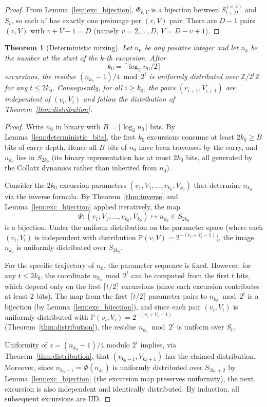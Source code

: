 \documentclass[12pt,a4paper]{article}
\newtheorem{theorem}{Theorem}[section]
\newcommand{\Prob}{\mathbb{P}}
\newcommand{\Z}{\mathbb{Z}}
\begin{document}
\begin{proof}
From Lemma~\ref{lem:exc_bijection}, $\Phi_{v,V}$ is a bijection between $S_{t+D}^{(v,V)}$ and $S_t$, so each $n'$ has exactly one preimage per $(v,V)$ pair. There are $D-1$ pairs $(v,V)$ with $v+V-1 = D$ (namely $v = 2,\ldots,D$, $V = D-v+1$).
\end{proof}

\begin{theorem}[Deterministic mixing]\label{thm:mixing}
Let $n_0$ be any positive integer and let $n_k$ be the number at the start of the $k$-th excursion. After
\[
k_0 = \lceil \log_2 n_0 / 2 \rceil
\]
excursions, the residue $(n_{k_0} - 1)/4 \bmod 2^t$ is uniformly distributed over $\Z/2^t\Z$ for any $t \le 2k_0$. Consequently, for all $i \ge k_0$, the pairs $(v_{i+1}, V_{i+1})$ are independent of $(v_i, V_i)$ and follow the distribution of Theorem~\ref{thm:distribution}.
\end{theorem}

\begin{proof}
Write $n_0$ in binary with $B = \lceil \log_2 n_0 \rceil$ bits. By Lemma~\ref{lem:deterministic_bits}, the first $k_0$ excursions consume at least $2k_0 \ge B$ bits of carry depth. Hence all $B$ bits of $n_0$ have been traversed by the carry, and $n_{k_0}$ lies in $S_{2k_0}$ (its binary representation has at most $2k_0$ bits, all generated by the Collatz dynamics rather than inherited from $n_0$).

Consider the $2k_0$ excursion parameters $(v_1,V_1,\ldots,v_{k_0},V_{k_0})$ that determine $n_{k_0}$ via the inverse formula. By Theorem~\ref{thm:inverse} and Lemma~\ref{lem:exc_bijection} applied iteratively, the map
\[
\Psi: (v_1,V_1,\ldots,v_{k_0},V_{k_0}) \longmapsto n_{k_0} \in S_{2k_0}
\]
is a bijection. Under the uniform distribution on the parameter space (where each $(v_i,V_i)$ is independent with distribution $\Prob(v,V) = 2^{-(v_i+V_i-1)}$), the image $n_{k_0}$ is uniformly distributed over $S_{2k_0}$.

For the specific trajectory of $n_0$, the parameter sequence is fixed. However, for any $t \le 2k_0$, the coordinate $n_{k_0} \bmod 2^t$ can be computed from the first $t$ bits, which depend only on the first $\lceil t/2 \rceil$ excursions (since each excursion contributes at least $2$ bits). The map from the first $\lceil t/2 \rceil$ parameter pairs to $n_{k_0} \bmod 2^t$ is a bijection (by Lemma~\ref{lem:exc_bijection}), and since each pair $(v_i,V_i)$ is uniformly distributed with $\Prob(v_i,V_i) = 2^{-(v_i+V_i-1)}$ (Theorem~\ref{thm:distribution}), the residue $n_{k_0} \bmod 2^t$ is uniform over $S_t$.

Uniformity of $z = (n_{k_0}-1)/4$ modulo $2^t$ implies, via Theorem~\ref{thm:distribution}, that $(v_{k_0+1}, V_{k_0+1})$ has the claimed distribution. Moreover, since $n_{k_0+1} = \Phi(n_{k_0})$ is uniformly distributed over $S_{2k_0+2}$ by Lemma~\ref{lem:exc_bijection} (the excursion map preserves uniformity), the next excursion is also independent and identically distributed. By induction, all subsequent excursions are IID.
\end{proof}
\end{document}
